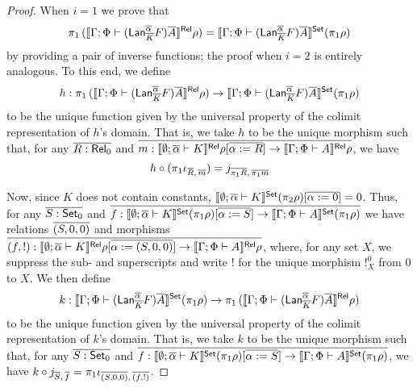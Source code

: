 \documentclass{lmcs}
\theoremstyle{plain}\newtheorem{satz}[thm]{Satz}
\newcommand{\set}{\mathsf{Set}}
\begin{document}
\begin{proof}
When $i = 1$ we prove that
\[
\pi_1 \,( \relsem{ \Gamma; \Phi \vdash (\Lan^{\ol \alpha}_{\ol{K}}
  F)\ol{A} } \rho ) = \setsem{ \Gamma; \Phi \vdash (\Lan^{\ol
    \alpha}_{\ol{K}} F)\ol{A} } (\pi_1 \rho)
\]
by
providing a pair of inverse functions; the proof when $i=2$ is
entirely analogous. To this end, we define
\[
h : \pi_1\, ( \relsem{ \Gamma; \Phi \vdash (\Lan^{\ol \alpha}_{\ol{K}}
  F)\ol{A} } \rho ) \to \setsem{ \Gamma; \Phi \vdash (\Lan^{\ol
    \alpha}_{\ol{K}} F)\ol{A} } (\pi_1 \rho)
\]
to be the unique function given by the universal property of the
colimit representation of $h$'s domain. That is, we take $h$ to be the
unique morphism such that, for any $\overline{R : \mathsf{Rel}_0}$ and $\overline{m :
  \llbracket{ \emptyset; \overline{\alpha} \vdash K }\rrbracket^{\mathsf{Rel}} \rho[\overline{\alpha := R}] \to
  \llbracket{ \Gamma; \Phi \vdash A }\rrbracket^{\mathsf{Rel}} \rho}$, we have
\begin{equation}\label{eq:cocone-proj}
h \circ (\pi_1 \iota_{\overline{R},\, \overline{m}}) = j_{\overline{\pi_1 R},
  \,\overline{\pi_1 m}}
\end{equation}

Now, since $K$ does not contain constants, $\setsem{ \emptyset;
  \ol\alpha \vdash K } (\pi_2 \rho) [\ol{\alpha := 0}] = 0$. Thus, for
any $\ol{S : \set_0}$ and $\ol{f : \setsem{ \emptyset; \ol\alpha
    \vdash K } (\pi_1 \rho)[\ol{\alpha := S}] \to \setsem{ \Gamma;
    \Phi \vdash A } (\pi_1 \rho)} $ we have relations $\overline{(S, 0, 0)}$
and morphisms $\overline{(f, !) : \llbracket{ \emptyset; \overline{\alpha} \vdash K }\rrbracket^{\mathsf{Rel}}
  \rho[\overline{\alpha := (S, 0, 0)}] \to \llbracket{ \Gamma; \Phi \vdash A }\rrbracket^{\mathsf{Rel}}
  \rho}$, where, for any set $X$, we suppress the sub- and
superscripts and write $!$ for the unique morphism $!^0_X$ from $0$ to
$X$. We then define
\[
k : \setsem{ \Gamma; \Phi \vdash (\Lan^{\ol \alpha}_{\ol{K}} F)\ol{A}
} (\pi_1 \rho) \to \pi_1 \,( \relsem{ \Gamma; \Phi \vdash (\Lan^{\ol
    \alpha}_{\ol{K}} F)\ol{A} } \rho )
\]
to be the unique function given by the universal property of the
colimit representation of $k$'s domain. That is, we take $k$ to be the
unique morphism such that, for any $\ol{S : \set_0}$ and $\ol{f :
  \setsem{ \emptyset; \ol\alpha \vdash K } (\pi_1 \rho)[\ol{\alpha :=
      S}] \to \setsem{ \Gamma; \Phi \vdash A } (\pi_1 \rho)}$, we have
$k \circ j_{\overline{S},\, \overline{f}} = \pi_1 \iota_{\overline{(S, 0, 0)},\, \overline{(f,
    !)}}$.


\end{proof}
\end{document}
